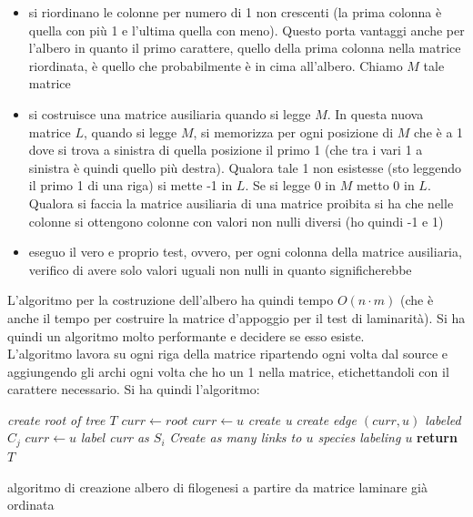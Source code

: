 \documentclass[a4paper,12pt, oneside]{book}
\begin{document}
\begin{itemize}
  \item si riordinano le colonne per numero di 1 non crescenti (la prima colonna
  è quella con più 1 e l'ultima quella con meno). Questo porta vantaggi anche
  per l'albero in quanto il primo carattere, quello della prima colonna nella
  matrice riordinata, è quello che probabilmente è in cima all'albero. Chiamo
  $M$ tale matrice
  \item si costruisce una matrice ausiliaria quando si legge $M$. In questa
  nuova matrice $L$, quando si legge $M$, si memorizza per ogni posizione di
  $M$ che è a 1 dove si trova a sinistra di quella posizione il primo 1 (che tra
  i vari 1 a sinistra è quindi quello più destra). Qualora tale 1 non esistesse
  (sto leggendo il primo 1 di una riga) si mette -1 in $L$. Se si legge 0 in $M$
  metto 0 in $L$. \\
  Qualora si faccia la matrice ausiliaria di una matrice proibita si ha che
  nelle colonne si ottengono colonne con valori non nulli diversi (ho quindi -1
  e 1)
  \item eseguo il vero e proprio test, ovvero, per ogni colonna della matrice
  ausiliaria, verifico di avere solo valori uguali non nulli in quanto
  significherebbe 
\end{itemize}
L'algoritmo per la costruzione dell'albero ha quindi tempo $O(n\cdot m)$ (che è
anche il tempo per costruire la matrice d'appoggio per il test di laminarità). 
Si ha quindi un algoritmo molto performante e decidere se esso esiste.\\
L'algoritmo lavora su ogni riga della matrice ripartendo ogni volta dal
source e aggiungendo gli archi ogni volta che ho un 1 nella matrice,
etichettandoli con il carattere necessario.
\newpage
Si ha quindi l'algoritmo:
\begin{algorithm}[H]
  \begin{algorithmic}
    \State \textit{create root of tree $T$}
    \State $curr\gets root$
    \State $curr\gets u$
    \Else
    \State \textit{create u}
    \State \textit{create edge $(curr, u)$ labeled $C_j$}
    \State $curr\gets u$
    \EndIf
    \EndIf
    \EndFor
    \State \textit{label curr as $S_i$}
    \EndFor
    \State \textit{Create as many links to $u$ species labeling $u$}
    \EndFor
    \State \textbf{return} $T$
    \EndFunction
  \end{algorithmic}
  \caption{algoritmo di creazione albero di filogenesi a partire da matrice
  laminare già ordinata}
\end{algorithm}
\end{document}
